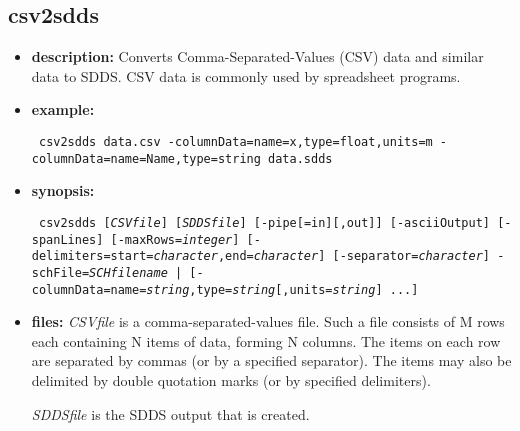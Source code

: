 %
%
%
%
%
\begin{latexonly}
\newpage
\end{latexonly}
\subsection{csv2sdds}
\label{csv2sdds}

\begin{itemize}
\item {\bf description:} Converts Comma-Separated-Values (CSV) data and similar data to SDDS. CSV data
is commonly used by spreadsheet programs.
\item {\bf example:} 
\begin{flushleft}{\tt
csv2sdds data.csv -columnData=name=x,type=float,units=m -columnData=name=Name,type=string data.sdds
}\end{flushleft}
\item {\bf synopsis:}
\begin{flushleft}{\tt
csv2sdds [{\em CSVfile}] [{\em SDDSfile}] [-pipe[=in][,out]] 
[-asciiOutput] [-spanLines] [-maxRows={\em integer}]
[-delimiters=start={\em character},end={\em character}] 
[-separator={\em character}] 
{-schFile={\em SCHfilename} | [-columnData=name={\em string},type={\em string}[,units={\em string}] ...]}
}\end{flushleft}
\item {\bf files: }
{\em CSVfile} is a comma-separated-values file.  Such a file consists of M rows each containing
N items of data, forming N columns.  The items on each row are separated by commas (or by a 
specified separator).  The items may also be delimited by double quotation marks (or by specified
delimiters).

{\em SDDSfile} is the SDDS output that is created.


\end{itemize}
